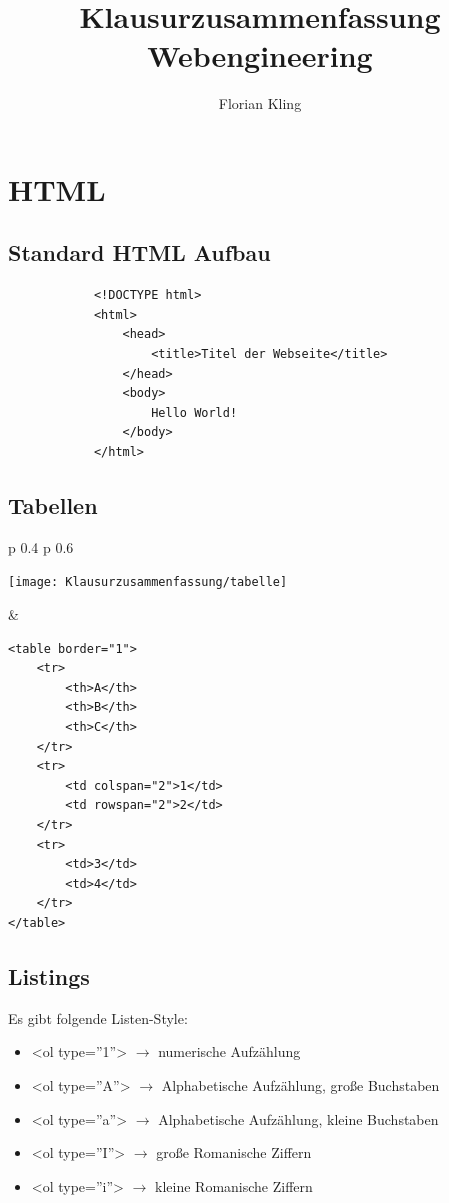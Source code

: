 \documentclass[11pt]{article}
\begin{document}
	
	\title{Klausurzusammenfassung Webengineering}
	\author{Florian Kling}
	
	\maketitle
	
	\newpage
	
	
	\section{HTML}
	
		\subsection{Standard HTML Aufbau}
		
		\begin{lstlisting}
			<!DOCTYPE html>
			<html>
				<head>
					<title>Titel der Webseite</title>
				</head>
				<body>
					Hello World!
				</body>
			</html>
		\end{lstlisting}
		
		
		\subsection{Tabellen}
	

			\begin{tabular}{p {0.4 \textwidth}  p {0.6 \textwidth} }
				\begin{center}
					\texttt{[image: Klausurzusammenfassung/tabelle]}
				\end{center}
			
			& 	
				\begin{lstlisting}
<table border="1">
	<tr>
		<th>A</th>
		<th>B</th>
		<th>C</th>
	</tr>
	<tr>
		<td colspan="2">1</td>
		<td rowspan="2">2</td>
	</tr>
	<tr>
		<td>3</td>
		<td>4</td>
	</tr>
</table>
				\end{lstlisting}
			\end{tabular}
			
		
			\newpage
	
	
		
			
			
		\subsection{Listings}
		
			Es gibt folgende Listen-Style:
			
			\begin{itemize}
				\item <ol type=''1''> $\rightarrow$ numerische Aufzählung
				\item <ol type=''A''> $\rightarrow$ Alphabetische Aufzählung, große Buchstaben
				\item <ol type=''a''> $\rightarrow$ Alphabetische Aufzählung, kleine Buchstaben
				\item <ol type=''I''> $\rightarrow$ große Romanische Ziffern
				\item <ol type=''i''> $\rightarrow$ kleine Romanische Ziffern
			\end{itemize}
			
\end{document}
